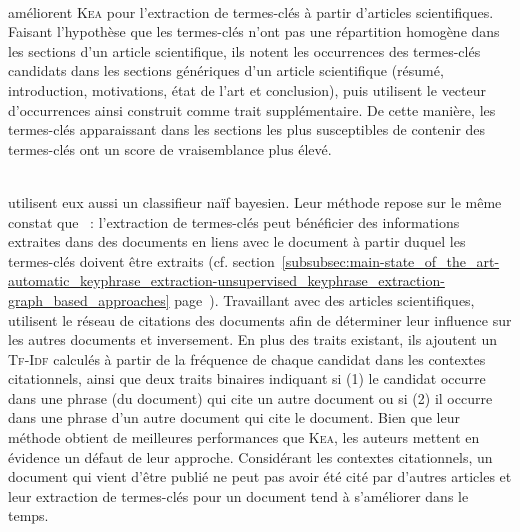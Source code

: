         ~\\ améliorent \textsc{Kea} pour
        l'extraction de termes-clés à partir d'articles scientifiques. Faisant
        l'hypothèse que les termes-clés n'ont pas une répartition homogène dans
        les sections d'un article scientifique, ils notent les occurrences des
        termes-clés candidats dans les sections génériques d'un article
        scientifique (résumé, introduction, motivations, état de l'art et
        conclusion), puis utilisent le vecteur d'occurrences ainsi construit
        comme trait supplémentaire. De cette manière, les termes-clés
        apparaissant dans les sections les plus susceptibles de contenir des
        termes-clés ont un score de vraisemblance plus élevé.
        
        ~\\ utilisent
        eux aussi un classifieur naïf bayesien. Leur méthode repose sur le même
        constat que ~: l'extraction de termes-clés
        peut bénéficier des informations extraites dans des documents en liens
        avec le document à partir duquel les termes-clés doivent être extraits
        (cf.
        section~\ref{subsubsec:main-state_of_the_art-automatic_keyphrase_extraction-unsupervised_keyphrase_extraction-graph_based_approaches}
        page~\pageref{subsubsec:main-state_of_the_art-automatic_keyphrase_extraction-unsupervised_keyphrase_extraction-graph_based_approaches}).
        Travaillant avec des articles scientifiques,
         utilisent le
        réseau de citations des documents afin de déterminer leur influence sur
        les autres documents et inversement. En plus des traits existant, ils
        ajoutent un \textsc{Tf-Idf} calculés à partir de la fréquence de chaque
        candidat dans les contextes citationnels, ainsi que deux traits binaires
        indiquant si (1) le candidat occurre dans une phrase (du document) qui cite
        un autre document ou si (2) il occurre dans une phrase d'un autre document
        qui cite le document. Bien que leur méthode obtient de meilleures
        performances que \textsc{Kea}, les auteurs mettent en évidence un défaut
        de leur approche. Considérant les contextes citationnels, un document
        qui vient d'être publié ne peut pas avoir été cité par d'autres articles
        et leur extraction de termes-clés pour un document tend à s'améliorer
        dans le temps.

